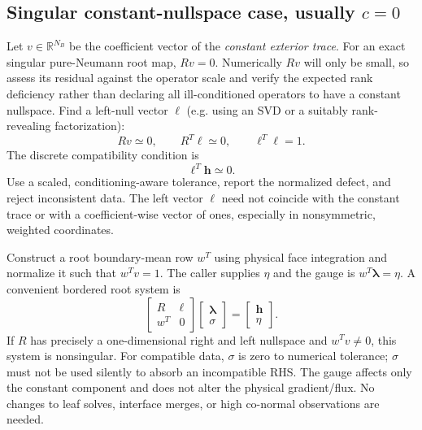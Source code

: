 \documentclass[11pt,letterpaper]{article}
\newcommand{\RR}{\mathbb R}
\newcommand{\lam}{\boldsymbol\lambda}
\newcommand{\rhs}{\mathbf h}
\begin{document}
\subsection{Singular constant-nullspace case, usually $c=0$}
Let $v\in\RR^{N_B}$ be the coefficient vector of the \emph{constant exterior
trace}. For an exact singular pure-Neumann root map, $Rv=0$.
Numerically $Rv$ will only be small, so assess its residual against the
operator scale and verify the expected rank deficiency rather than declaring
all ill-conditioned operators to have a constant nullspace.
Find a left-null
vector $\ell$ (e.g. using an SVD or a suitably rank-revealing factorization):
\begin{equation}\label{eq:discretekernels}
 Rv\simeq0,\qquad R^T\ell\simeq0,\qquad
 \ell^T\ell=1.
\end{equation}
The discrete compatibility condition is
\begin{equation}\label{eq:discretecompat}
 \boxed{\ell^T\rhs\simeq0.}
\end{equation}
Use a scaled, conditioning-aware tolerance, report the normalized defect,
and reject inconsistent data. The left vector $\ell$ need not coincide with
the constant trace or with a coefficient-wise vector of ones, especially
in nonsymmetric, weighted coordinates.

Construct a root boundary-mean row $w^T$ using physical face integration
and normalize it such that $w^Tv=1$. The caller supplies $\eta$ and the
gauge is $w^T\lam=\eta$. A convenient bordered root system is
\begin{equation}\label{eq:bordered}
 \boxed{
 \begin{bmatrix}R&\ell\\w^T&0\end{bmatrix}
 \begin{bmatrix}\lam\\\sigma\end{bmatrix}
 =\begin{bmatrix}\rhs\\\eta\end{bmatrix}.}
\end{equation}
If $R$ has precisely a one-dimensional right and left nullspace and
$w^Tv\ne0$, this system is nonsingular. For compatible data, $\sigma$ is
zero to numerical tolerance; $\sigma$ must not be used silently to absorb
an incompatible RHS. The gauge affects only the constant component and does
not alter the physical gradient/flux. No changes to leaf solves, interface
merges, or high co-normal observations are needed.
\end{document}
